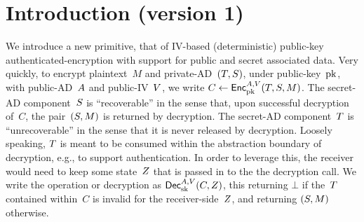 \section{Introduction (version 1)}
\label{sec:intro}
We introduce a new primitive, that of IV-based (deterministic) public-key authenticated-encryption with support for public and secret associated data.  Very quickly, to encrypt plaintext~$M$ and private-AD~$(T,S)$, under public-key~$\mathrm{pk}$, with public-AD~$A$ and public-IV~$V$, we write $C\gets{\mathsf{Enc}}_{\mathrm{pk}}^{A,V}(T,S,M)$.
The secret-AD component~$S$ is ``recoverable'' in the sense that, upon successful decryption of~$C$, the pair~$(S,M)$ is returned by decryption.  The secret-AD component~$T$ is ``unrecoverable'' in the sense that it is never released by decryption.  Loosely speaking, $T$ is meant to be consumed within the abstraction boundary of decryption, e.g., to support authentication.  In order to leverage this, the receiver would need to keep some state~$Z$ that is passed in to the the decryption call.  We write the operation or decryption as ${\mathsf{Dec}}_{\mathrm{sk}}^{A,V}(C,Z)$, this returning $\bot$ if the~$T$ contained within~$C$ is invalid for the receiver-side~$Z$, and returning $(S,M)$ otherwise.

